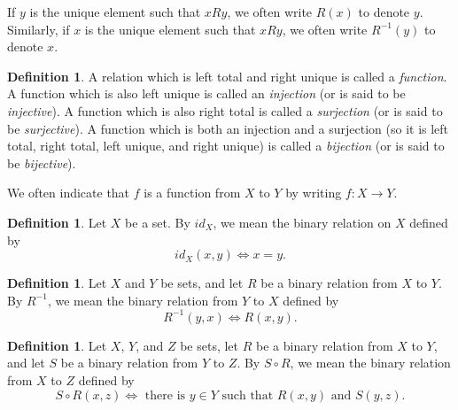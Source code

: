 \documentclass[letterpaper]{article}
\theoremstyle{definition}
\newtheorem{definition}[theorem]{Definition}
\newcommand{\defterm}{\emph}
\newcommand{\inverse}[1]{{#1^{-1}}}
\newcommand{\compose}{\circ}
\begin{document}
If \(y\) is the unique element such that \(x R y\), we often write
\(R(x)\) to denote \(y\).  Similarly, if \(x\) is the unique element
such that \(xRy\), we often write \(\inverse{R}(y)\) to denote \(x\).

\begin{definition}
  A relation which is left total and right unique is called a
  \defterm{function}.  A function which is also left unique is called
  an \defterm{injection} (or is said to be \defterm{injective}).  A
  function which is also right total is called a \defterm{surjection}
  (or is said to be \defterm{surjective}).  A function which is both
  an injection and a surjection (so it is left total, right total,
  left unique, and right unique) is called a \defterm{bijection} (or
  is said to be \defterm{bijective}).
\end{definition}

We often indicate that \(f\) is a function from \(X\) to \(Y\) by
writing \(f:X \to Y\).

\begin{definition}
  Let \(X\) be a set.  By \(id_X\), we mean the binary relation on
  \(X\) defined by
  \[id_X(x,y) \iff x = y \text{.}\]
\end{definition}

\begin{definition}
  Let \(X\) and \(Y\) be sets, and let \(R\) be a binary relation from
  \(X\) to \(Y\).  By \(\inverse{R}\), we mean the binary relation
  from \(Y\) to \(X\) defined by
  \[\inverse{R}(y,x) \iff R(x,y) \text{.}\]
\end{definition}

\begin{definition}
  Let \(X\), \(Y\), and \(Z\) be sets, let \(R\) be a binary relation
  from \(X\) to \(Y\), and let \(S\) be a binary relation from \(Y\)
  to \(Z\).  By \(S \compose R\), we mean the binary relation from
  \(X\) to \(Z\) defined by
  \[S \compose R(x,z) \iff \text{ there is } y \in Y \text{ such that } R(x,y) \text{ and } S(y,z) \text{.}\]
\end{definition}
\end{document}
